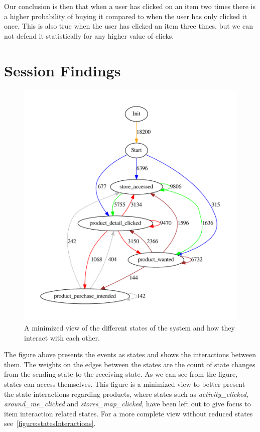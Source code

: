 Our conclusion is then that when a user has clicked on an item two times there
is a higher probability of buying it compared to when the user has only
clicked it once. This is also true when the user has clicked an item three
times, but we can not defend it statistically for any higher value of clicks.

\section{Session Findings}
    \label{sec:sessionFindings}
    \begin{figure}[H]
        \includegraphics[width=5in]{image/statesInteractionTrue-gvfile.pdf}
        \centering
        \caption{A minimized view of the different states of the system and how they interact with each other.}
        \label{figure:minStatesInteractions}
    \end{figure}
        The figure above presents the events as states and shows the interactions between them.
        The weights on the edges between the states are the count of state changes from the sending state to the receiving state.
        As we can see from the figure, states can access themselves.
        This figure is a minimized view to better present the state interactions regarding products, where states such as \emph{activity\_clicked}, \emph{around\_me\_clicked} and \emph{stores\_map\_clicked}, have been left out to give focus to item interaction related states.
        For a more complete view without reduced states see~\ref{figure:statesInteractions}.

